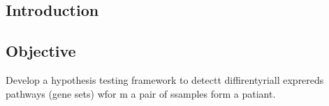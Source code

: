 \documentclass[a0,portrait]{a0poster}
\begin{document}
\begin{multicols}{3} %

 
  

\color{Black} %
\section{Introduction}

\subsection{Objective}
  Develop a hypothesis testing framework to detectt diffirentyriall exprereds pathways (gene sets) wfor m a pair of ssamples form a  patiant.


\end{multicols}
\end{document}
